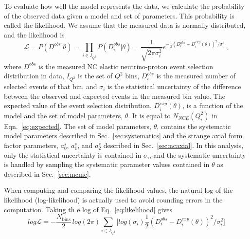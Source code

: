     To evaluate how well the model represents the data, we calculate the
    probability of the observed data given a model and set of parameters.  This
    probability is called the likelihood. We assume that the measured data is
    normally distributed, and the likelihood is
    \begin{equation}\label{eq:likelihood}
      \mathcal{L} = P(D^{obs}|\theta) = \prod_{i\in I_{Q^2}} P(D^{obs}_i|\theta) = \frac{1}{\sqrt{2\pi \sigma_i^2}}
             e^{-\frac{1}{2}(D^{obs}_i - D^{exp}_i(\theta))^2/\sigma_i^2} \,,
    \end{equation}
    where $D^{obs}$ is the measured NC elastic neutrino-proton event selection
    distribution in data, $I_{Q^2}$ is the set of $Q^2$ bins, $D^{obs}_i$ is
    the measured number of selected events of that bin, and $\sigma_i$ is the
    statistical uncertainty of the difference between the observed and expected
    events in the measured bin value. The expected value of the event selection
    distribution, $D^{exp}_i(\theta)$, is a function of the model and the set
    of model parameters, $\theta$. It is equal to $N_{NCE}(Q^2_i)$ in
    Eqn.~\ref{eq:expected}. The set of model parameters, $\theta$, contains the
    systematic model parameters described in Sec.~\ref{sec:systematics} and the
    strange axial form factor parameters, $a_0^s$, $a_1^s$, and $a_2^s$
    described in Sec.~\ref{sec:ncaxial}. In this analysis, only the statistical
    uncertainty is contained in $\sigma_i$, and the systematic uncertainty is
    handled by sampling the systematic parameter values contained in $\theta$
    as described in Sec.~\ref{sec:mcmc}.

    When computing and comparing the likelihood values, the  natural log of the
    likelihood (log-likelihood) is actually used to avoid rounding errors in
    the computation. Taking th e log of Eq.~\ref{eq:likelihood} gives
    \begin{equation}
      log\mathcal{L} = -\frac{N_{\textrm{bins}}}{2}\, log(2\pi) \sum_{i\in I_{Q^2}}\Big[ log(\sigma_i) \frac{1}{2}(D_i^{obs} - D_i^{exp}(\theta))^2/\sigma_i^2 \Big]
    \end{equation}

